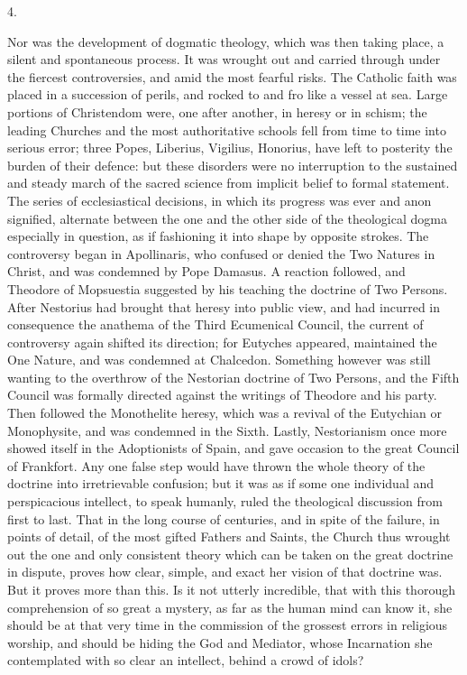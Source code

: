 4.

Nor was the development of dogmatic theology, which was then taking
place, a silent and spontaneous process. It was wrought out and
carried through under the fiercest controversies, and amid the most
fearful risks. The Catholic faith was placed in a succession of
perils, and rocked to and fro like a vessel at sea. Large portions of
Christendom were, one after another, in heresy or in schism; the
leading Churches and the most authoritative schools fell from time to
time into serious error; three Popes, Liberius, Vigilius, Honorius,
have left to posterity the burden of their defence: but these
disorders were no interruption to the sustained and steady march of
the sacred science from implicit belief to formal statement. The
series of ecclesiastical decisions, in which its progress was ever and
anon signified, alternate between the one and the other side of the
theological dogma especially in question, as if fashioning it into
shape by opposite strokes. The controversy began in Apollinaris, who
confused or denied the Two Natures in Christ, and was condemned by
Pope Damasus. A reaction followed, and Theodore of Mopsuestia
suggested by his teaching the doctrine of Two Persons. After Nestorius
had brought that heresy into public view, and had incurred in
consequence the anathema of the Third Ecumenical Council, the current
of controversy again shifted its direction; for Eutyches appeared,
maintained the One Nature, and was condemned at Chalcedon. Something
however was still wanting to the overthrow of the Nestorian doctrine
of Two Persons, and the Fifth Council was formally directed against
the writings of Theodore and his party. Then followed the Monothelite
heresy, which was a revival of the Eutychian or Monophysite, and was
condemned in the Sixth. Lastly, Nestorianism once more showed itself
in the Adoptionists of Spain, and gave occasion to the great Council
of Frankfort. Any one false step would have thrown the whole theory of
the doctrine into irretrievable confusion; but it was as if some one
individual and perspicacious intellect, to speak humanly, ruled the
theological discussion from first to last. That in the long course of
centuries, and in spite of the failure, in points of detail, of the
most gifted Fathers and Saints, the Church thus wrought out the one
and only consistent theory which can be taken on the great doctrine in
dispute, proves how clear, simple, and exact her vision of that
doctrine was. But it proves more than this. Is it not utterly
incredible, that with this thorough comprehension of so great a
mystery, as far as the human mind can know it, she should be at that
very time in the commission of the grossest errors in religious
worship, and should be hiding the God and Mediator, whose Incarnation
she contemplated with so clear an intellect, behind a crowd of idols?

